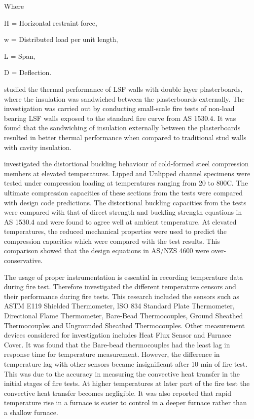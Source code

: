 Where
\begin{description}[itemsep=0pt,parsep=0pt]
	\item H = Horizontal restraint force,
	\item w = Distributed load per unit length,
	\item L = Span,
	\item D = Deflection.
\end{description}

\citet{Kolarkar2008} studied the thermal performance of LSF walls with double layer plasterboards, where the insulation was sandwiched between the plasterboards externally. The investigation was carried out by conducting small-scale fire tests of non-load bearing LSF walls exposed to the standard fire curve from AS 1530.4. It was found that the sandwiching of insulation externally between the plasterboards resulted in better thermal performance when compared to traditional stud walls with cavity insulation. 

\citet{Ranawaka2009} investigated the distortional buckling behaviour of cold-formed steel compression members at elevated temperatures. Lipped and Unlipped channel specimens were tested under compression loading at temperatures ranging from 20 to 800\degree C. The ultimate compression capacities of these sections from the tests were compared with design code predictions. The distortional buckling capacities from the tests were compared with that of direct strength and buckling strength equations in AS 1530.4 and were found to agree well at ambient temperature. At elevated temperatures, the reduced mechanical properties were used to predict the compression capacities which were compared with the test results. This comparison showed that the design equations in AS/NZS 4600 were over-conservative.

The usage of proper instrumentation is essential in recording temperature data during fire test. Therefore \citet{Sultan2010} investigated the different temperature censors and their performance during fire tests. This research included the sensors such as ASTM E119 Shielded Thermometer, ISO 834 Standard Plate Thermometer, Directional Flame Thermometer, Bare-Bead Thermocouples, Ground Sheathed Thermocouples and Ungrounded Sheathed Thermocouples. Other measurement devices considered for investigation includes Heat Flux Sensor and Furnace Cover. It was found that the Bare-bead thermocouples had the least lag in response time for temperature measurement. However, the difference in temperature lag with other sensors became insignificant after 10 min of fire test. This was due to the accuracy in measuring the convective heat transfer in the initial stages of fire tests. At higher temperatures at later part of the fire test the convective heat transfer becomes negligible. It was also reported that rapid temperature rise in a furnace is easier to control in a deeper furnace rather than a shallow furnace.


